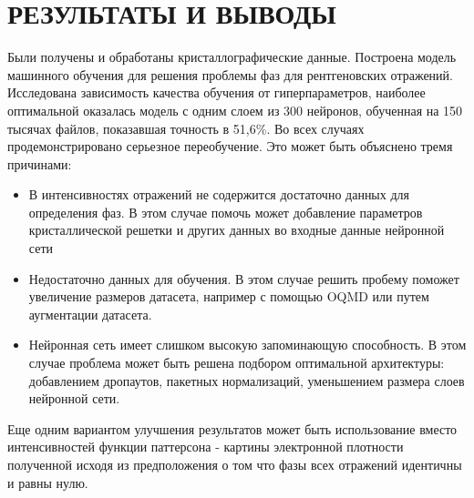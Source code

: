 \documentclass{article}
\begin{document}






\newpage
\section{РЕЗУЛЬТАТЫ И ВЫВОДЫ}

Были получены и обработаны кристаллографические данные. Построена модель машинного обучения для решения проблемы фаз для рентгеновских отражений. Исследована зависимость качества обучения от гиперпараметров, наиболее оптимальной оказалась модель с одним слоем из 300 нейронов, обученная на 150 тысячах файлов, показавшая точность в 51,6\%. Во всех случаях продемонстрировано серьезное переобучение. Это может быть объяснено тремя причинами:
\begin{itemize}
\item В интенсивностях отражений не содержится достаточно данных для определения фаз. В этом случае помочь может добавление параметров кристаллической решетки и других данных во входные данные нейронной сети
\item Недостаточно данных для обучения. В этом случае решить пробему поможет увеличение размеров датасета, например с помощью OQMD или путем аугментации датасета.
\item Нейронная сеть имеет слишком высокую запоминающую способность. В этом случае проблема может быть решена подбором оптимальной архитектуры: добавлением дропаутов, пакетных нормализаций, уменьшением размера слоев нейронной сети.
\end{itemize}
Еще одним вариантом улучшения результатов может быть использование вместо интенсивностей функции паттерсона\cite{PattersonMethod} - картины электронной плотности полученной исходя из предположения о том что фазы всех отражений идентичны и равны нулю. 
\newpage
\printbibliography
\end{document}

